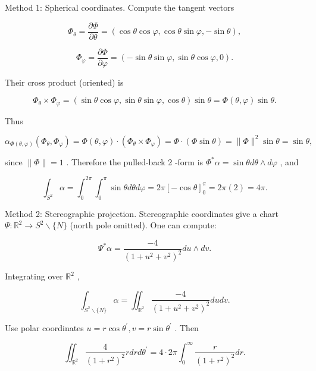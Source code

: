 \documentclass[10pt]{article}
\begin{document}
Method 1: Spherical coordinates. Compute the tangent vectors

\[
{\Phi }_{\theta } = \frac{\partial \Phi }{\partial \theta } = \left( {\cos \theta \cos \varphi ,\cos \theta \sin \varphi , - \sin \theta }\right) ,
\]

\[
{\Phi }_{\varphi } = \frac{\partial \Phi }{\partial \varphi } = \left( {-\sin \theta \sin \varphi ,\sin \theta \cos \varphi ,0}\right) .
\]

Their cross product (oriented) is

\[
{\Phi }_{\theta } \times  {\Phi }_{\varphi } = \left( {\sin \theta \cos \varphi ,\sin \theta \sin \varphi ,\cos \theta }\right) \sin \theta  = \Phi \left( {\theta ,\varphi }\right) \sin \theta .
\]

Thus

\[
{\alpha }_{\Phi \left( {\theta ,\varphi }\right) }\left( {{\Phi }_{\theta },{\Phi }_{\varphi }}\right)  = \Phi \left( {\theta ,\varphi }\right)  \cdot  \left( {{\Phi }_{\theta } \times  {\Phi }_{\varphi }}\right)  = \Phi  \cdot  \left( {\Phi \sin \theta }\right)  = \parallel \Phi {\parallel }^{2}\sin \theta  = \sin \theta ,
\]

since \(\parallel \Phi \parallel  = 1\) . Therefore the pulled-back 2 -form is \({\Phi }^{ * }\alpha  = \sin {\theta d\theta } \land  {d\varphi }\) , and

\[
{\int }_{{S}^{2}}\alpha  = {\int }_{0}^{2\pi }{\int }_{0}^{\pi }\sin {\theta d\theta d\varphi } = {2\pi }{\left\lbrack  -\cos \theta \right\rbrack  }_{0}^{\pi } = {2\pi }\left( 2\right)  = {4\pi }.
\]

Method 2: Stereographic projection. Stereographic coordinates give a chart \(\Psi  : {\mathbb{R}}^{2} \rightarrow  {S}^{2} \smallsetminus  \{ N\}\) (north pole omitted). One can compute:

\[
{\Psi }^{ * }\alpha  = \frac{-4}{{\left( 1 + {u}^{2} + {v}^{2}\right) }^{2}}{du} \land  {dv}.
\]

Integrating over \({\mathbb{R}}^{2}\) ,

\[
{\int }_{{S}^{2}\smallsetminus \{ N\} }\alpha  = {\iint }_{{\mathbb{R}}^{2}}\frac{-4}{{\left( 1 + {u}^{2} + {v}^{2}\right) }^{2}}{dudv}.
\]

Use polar coordinates \(u = r\cos {\theta }^{\prime },v = r\sin {\theta }^{\prime }\) . Then

\[
{\iint }_{{\mathbb{R}}^{2}}\frac{4}{{\left( 1 + {r}^{2}\right) }^{2}}{rdrd}{\theta }^{\prime } = 4 \cdot  {2\pi }{\int }_{0}^{\infty }\frac{r}{{\left( 1 + {r}^{2}\right) }^{2}}{dr}.
\]
\end{document}
